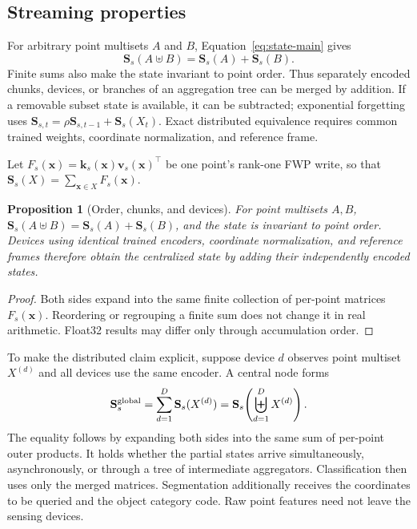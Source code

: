 \documentclass[11pt,a4paper]{article}
\newtheorem{proposition}{Proposition}
\newcommand{\Sstate}{\mathbf{S}}
\begin{document}
\subsection{Streaming properties}
For arbitrary point multisets $A$ and $B$, Equation~\eqref{eq:state-main} gives
\begin{equation}
\Sstate_s(A\uplus B)=\Sstate_s(A)+\Sstate_s(B).
\label{eq:add-main}
\end{equation}
Finite sums also make the state invariant to point order. Thus separately encoded chunks, devices, or branches of an aggregation tree can be merged by addition. If a removable subset state is available, it can be subtracted; exponential forgetting uses $\Sstate_{s,t}=\rho\Sstate_{s,t-1}+\Sstate_s(X_t)$. Exact distributed equivalence requires common trained weights, coordinate normalization, and reference frame.

Let $F_s(\bm x)=\bm k_s(\bm x)\bm v_s(\bm x)^\top$ be one point's rank-one FWP write, so that $\Sstate_s(X)=\sum_{\bm x\in X}F_s(\bm x)$.

\begin{proposition}[Order, chunks, and devices]
\label{prop:order}
For point multisets $A,B$, $\Sstate_s(A\uplus B)=\Sstate_s(A)+\Sstate_s(B)$, and the state is invariant to point order. Devices using identical trained encoders, coordinate normalization, and reference frames therefore obtain the centralized state by adding their independently encoded states.
\end{proposition}
\begin{proof}
Both sides expand into the same finite collection of per-point matrices $F_s(\bm x)$. Reordering or regrouping a finite sum does not change it in real arithmetic. Float32 results may differ only through accumulation order.
\end{proof}

To make the distributed claim explicit, suppose device $d$ observes point multiset $X^{(d)}$ and all devices use the same encoder. A central node forms
\begin{equation}
\Sstate_s^{\rm global}=\sum_{d=1}^{D}\Sstate_s(X^{(d)})
=\Sstate_s\!\left(\biguplus_{d=1}^{D}X^{(d)}\right).
\label{eq:distributed-main}
\end{equation}
The equality follows by expanding both sides into the same sum of per-point outer products. It holds whether the partial states arrive simultaneously, asynchronously, or through a tree of intermediate aggregators. Classification then uses only the merged matrices. Segmentation additionally receives the coordinates to be queried and the object category code. Raw point features need not leave the sensing devices.
\end{document}
